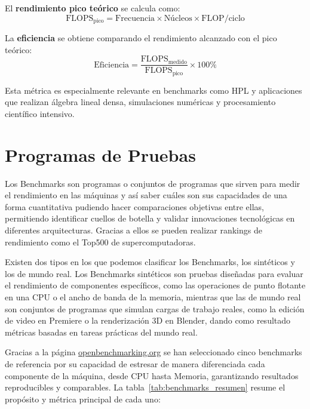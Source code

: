 \documentclass[11pt,a4paper]{article}
\begin{document}
\begin{itemize}
    El \textbf{rendimiento pico teórico} se calcula como:
    \[
        \text{FLOPS}_{\text{pico}} = \text{Frecuencia} \times \text{Núcleos} \times \text{FLOP/ciclo}
    \]
    
    La \textbf{eficiencia} se obtiene comparando el rendimiento alcanzado con el pico teórico:
    \[
        \text{Eficiencia} = \frac{\text{FLOPS}_{\text{medido}}}{\text{FLOPS}_{\text{pico}}} \times 100\%
    \]
    
    \noindent Esta métrica es especialmente relevante en benchmarks como HPL y aplicaciones que realizan álgebra lineal densa, simulaciones numéricas y procesamiento científico intensivo.
\end{itemize}

\section{Programas de Pruebas}

Los Benchmarks son programas o conjuntos de programas que sirven para medir el rendimiento en las máquinas y así saber cuáles son sus capacidades de una forma 
cuantitativa pudiendo hacer comparaciones objetivas entre ellas, permitiendo identificar cuellos de botella y validar innovaciones tecnológicas en diferentes arquitecturas.  
Gracias a ellos se pueden realizar rankings de rendimiento como el Top500 de supercomputadoras.

Existen dos tipos en los que podemos clasificar los Benchmarks, los sintéticos y los de mundo real. Los Benchmarks sintéticos son pruebas diseñadas para evaluar el rendimiento de componentes específicos,
como las operaciones de punto flotante en una CPU o el ancho de banda de la memoria, mientras que las de mundo real son conjuntos de programas que simulan cargas de trabajo reales, como la edición de video 
en Premiere o la renderización 3D en Blender, dando como resultado métricas basadas en tareas prácticas del mundo real.

Gracias a la página \href{https://openbenchmarking.org}{openbenchmarking.org} se han seleccionado cinco benchmarks de referencia por su capacidad de estresar de manera diferenciada cada componente de la máquina, 
desde CPU hasta Memoria, garantizando resultados reproducibles y comparables. La tabla~\ref{tab:benchmarks_resumen} resume el propósito y métrica principal de cada uno:
\end{document}
